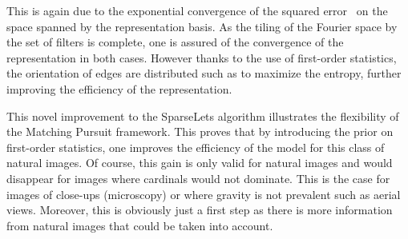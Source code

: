 \documentclass[a4paper, 11pt]{book}
\begin{document}
This is again due to the exponential convergence of the squared error~\citep[p.~422]{Mallat98} on the space spanned by the representation basis.
As the tiling of the Fourier space by the set of filters is complete,
one is assured of the convergence of the representation in both cases.
However thanks to the use of first-order statistics, the orientation of edges are distributed such as to maximize the entropy, further improving the efficiency of the representation.

This novel improvement to the SparseLets algorithm illustrates the flexibility of the Matching Pursuit framework. %
This proves that by introducing the prior on first-order statistics, one improves the efficiency of the model for this class of natural images.
Of course, this gain is only valid for natural images and would disappear for images where cardinals would not dominate. This is the case for images of close-ups (microscopy) or where gravity is not prevalent such as aerial views.
Moreover, this is obviously just a first step as there is more information from natural images that could be taken into account.

\end{document}

